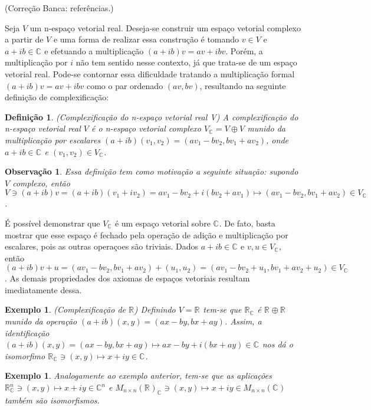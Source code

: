 \documentclass[12pt]{book}
\newtheorem{definicao}[teorema]{Definição}
\newtheorem{exemplo}[teorema]{Exemplo}
\newtheorem{observacao}[teorema]{Observação}
\newcommand{\complexificacao}[1]{#1_{\complexo{}}}
\newcommand{\complexo}[1]{\mathbb{C}^{#1}}
\newcommand{\matrizquadcomplexa}[1]{M_{#1 \times #1}(\complexo{})}
\newcommand{\matrizquadreal}[1]{M_{#1 \times #1}(\real{})}
\newcommand{\real}[1]{\mathbb{R}^{#1}}
\newcommand{\reta}{\real{}}
\newcommand{\alerta}[1]{{\color{red}#1}}
\newcommand{\correcaobanca}[1]{\alerta{(Correção Banca: #1)}}
\begin{document}
	\correcaobanca{referências.}
	
	Seja $V$ um n-espaço vetorial real. Deseja-se construir um espaço vetorial complexo a partir de $V$ e uma forma de realizar essa construção é tomando $v \in V $ e $a+ib \in \complexo{}$ e efetuando a multiplicação $(a+ib)v = av+ibv$. Porém, a multiplicação por $i$ não tem sentido nesse contexto, já que trata-se de um espaço vetorial real. Pode-se contornar essa dificuldade tratando a multiplicação formal $(a+ib)v = av+ibv$ como o par ordenado $(av, bv)$, resultando na seguinte definição de complexificação:
	
	\begin{definicao}
		(Complexificação do n-espaço vetorial real V) A complexificação do n-espaço vetorial real $V$ é o n-espaço vetorial complexo $\complexificacao{V}=V\oplus V$ munido da multiplicação por escalares $(a+ib)(v_{1}, v_{2}) = (av_{1}-bv_{2}, bv_{1}+ av_{2})$, onde $a+ib \in \complexo{}$ e $(v_{1}, v_{2})\in \complexificacao{V}$.
	\end{definicao}
	
	\begin{observacao}
		Essa definição tem como motivação a seguinte situação: supondo $V$ complexo, então $V \ni (a+ib)v = (a+ib)(v_{1}+iv_{2}) = av_{1}-bv_{2}+i(bv_{2}+av_{1}) \mapsto (av_{1}-bv_{2}, bv_{1}+ av_{2}) \in \complexificacao{V}$.
	\end{observacao}
	
	É possível demonstrar que $\complexificacao{V}$ é um espaço vetorial sobre $\complexo{}$. De fato, basta mostrar que esse espaço é fechado pela operação de adição e multiplicação por escalares, pois as outras operaçoes são triviais. Dados $a+ib \in \complexo{}$ e $v,u \in \complexificacao{V}$, então $(a+ib )v+u = (av_{1}-bv_{2}, bv_{1}+ av_{2}) + (u_{1}, u_{2}) = (av_{1}-bv_{2} + u_{1}, bv_{1}+ av_{2} + u_{2}) \in \complexificacao{V}$. As demais propriedades dos axiomas de espaços vetoriais resultam imediatamente dessa.
	
	\begin{exemplo}\label{exemplo_conjugado_reta_real}
		(Complexificação de $\reta$) Definindo $V = \reta$ tem-se que $\complexificacao{\reta}$ é $\reta\oplus \reta$ munido da operação $(a+ib)(x,y) = (ax-by, bx+ay)$. Assim, a identificação $(a+ib)(x, y ) = (ax-by, bx+ay) \mapsto ax-by+i(bx+ay) \in \complexo{}$ nos dá o isomorfimo $\complexificacao{\reta} \ni (x,y)\mapsto x +iy\in \complexo{}$.
	\end{exemplo}
	
	\begin{exemplo}\label{exemplo_complexificacao_matrizes}
		Analogamente ao exemplo anterior, tem-se que as aplicações $\complexificacao{\real{n}} \ni (x,y) \mapsto x+iy \in \complexo{n}$ e  $\complexificacao{\matrizquadreal{n}} \ni (x,y) \mapsto x+iy \in \matrizquadcomplexa{n}$ também são isomorfismos.
	\end{exemplo}
	
\end{document}
